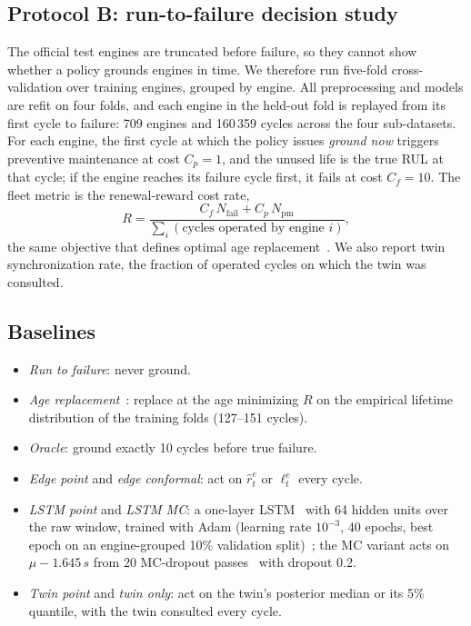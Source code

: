 \documentclass[pdflatex,sn-mathphys-num]{sn-jnl}
\begin{document}
\subsection{Protocol B: run-to-failure decision study}
The official test engines are truncated before failure, so they cannot show whether a policy grounds engines in time. We therefore run five-fold cross-validation over training engines, grouped by engine. All preprocessing and models are refit on four folds, and each engine in the held-out fold is replayed from its first cycle to failure: 709 engines and 160\,359 cycles across the four sub-datasets. For each engine, the first cycle at which the policy issues \emph{ground now} triggers preventive maintenance at cost $C_p = 1$, and the unused life is the true RUL at that cycle; if the engine reaches its failure cycle first, it fails at cost $C_f = 10$. The fleet metric is the renewal-reward cost rate,
\begin{equation}
R = \frac{C_f\,N_{\mathrm{fail}} + C_p\,N_{\mathrm{pm}}}{\sum_i (\text{cycles operated by engine } i)},
\end{equation}
the same objective that defines optimal age replacement~\cite{barlow1960optimum}. We also report twin synchronization rate, the fraction of operated cycles on which the twin was consulted.

\subsection{Baselines}
\begin{itemize}
\item \emph{Run to failure}: never ground.
\item \emph{Age replacement}~\cite{barlow1960optimum}: replace at the age minimizing $R$ on the empirical lifetime distribution of the training folds (127--151 cycles).
\item \emph{Oracle}: ground exactly 10 cycles before true failure.
\item \emph{Edge point} and \emph{edge conformal}: act on $\hat r^{e}_t$ or $\ell^{e}_t$ every cycle.
\item \emph{LSTM point} and \emph{LSTM MC}: a one-layer LSTM~\cite{hochreiter1997lstm,zheng2017lstm} with 64 hidden units over the raw window, trained with Adam (learning rate $10^{-3}$, 40 epochs, best epoch on an engine-grouped 10\% validation split)~\cite{paszke2019pytorch}; the MC variant acts on $\mu - 1.645\,s$ from 20 MC-dropout passes~\cite{gal2016dropout} with dropout 0.2.
\item \emph{Twin point} and \emph{twin only}: act on the twin's posterior median or its 5\% quantile, with the twin consulted every cycle.
\end{itemize}
\end{document}
